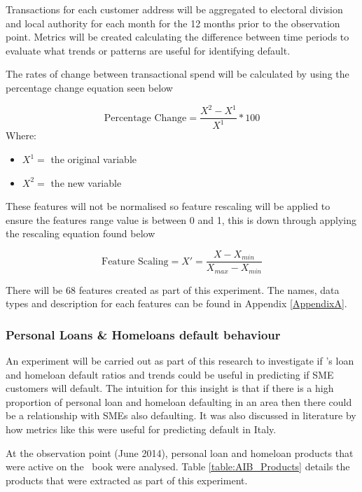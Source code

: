 Transactions for each customer address will be aggregated to electoral division and local authority for each month for the 12 months prior to the observation point. Metrics will be created calculating the difference between time periods to evaluate what trends or patterns are useful for identifying default. 

The rates of change between transactional spend will be calculated by using the percentage change equation seen below

\begin{equation} \label{eqn:PercentageChange}
\text{Percentage Change} = \frac{X^{2} - X^{1}}{X^{1}}*100  
\end{equation}
Where: 
\vspace{-7mm} 
\begin{itemize}
	\item $X^{1} = $ the original variable
	\item $X^{2} = $ the new variable
\end{itemize}

These features will not be normalised so feature rescaling will be applied to ensure the features range value is between 0 and 1, this is down through applying the rescaling equation found below  

\begin{equation}\label{eqn:rescaling}
\text{Feature Scaling} =  X' = \frac{X - X_{min}}{X_{max} - X_{min}}
\end{equation}

There will be 68 features created as part of this experiment. The names, data types and description for each features can be found in Appendix \ref{AppendixA}.



\subsubsection{Personal Loans \& Homeloans default behaviour}
An experiment will be carried out as part of this research to investigate if \subjectname's loan and homeloan default ratios and trends could be useful in predicting if SME customers will default. The intuition for this insight is that if there is a high proportion of personal loan and homeloan defaulting in an area then there could be a relationship with SMEs also defaulting. It was also discussed in literature by \cite{di_pietro_regional} how metrics like this were useful for predicting default in Italy.

At the observation point (June 2014), personal loan and homeloan products that were active on the \subjectname\ book were analysed. Table \ref{table:AIB_Products} details the products that were extracted as part of this experiment.

